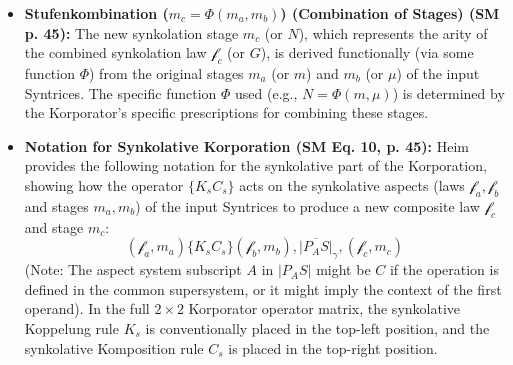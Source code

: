 \documentclass[12pt]{article}
\newcommand{\synkolator}{\mathcal{f}}
\newcommand{\synkolationsstufe}{m}
\newcommand{\aspektivsystem}{P}
\newcommand{\subjektiveraspekt}{S}
\begin{document}
\begin{itemize}
\begin{enumerate}
\begin{itemize}
            \item \textbf{Stufenkombination (\( \synkolationsstufe_c = \Phi(\synkolationsstufe_a,\synkolationsstufe_b) \)) (Combination of Stages) (SM p. 45):} The new synkolation stage \( \synkolationsstufe_c \) (or \(N\)), which represents the arity of the combined synkolation law \( \synkolator_c \) (or \(G\)), is derived functionally (via some function \( \Phi \)) from the original stages \( \synkolationsstufe_a \) (or \(m\)) and \( \synkolationsstufe_b \) (or \(\mu\)) of the input Syntrices. The specific function \( \Phi \) used (e.g., \( N = \Phi(m,\mu) \)) is determined by the Korporator's specific prescriptions for combining these stages.
            \item \textbf{Notation for Synkolative Korporation (SM Eq. 10, p. 45):}
            Heim provides the following notation for the synkolative part of the Korporation, showing how the operator \( \{K_s C_s\} \) acts on the synkolative aspects (laws \( \synkolator_a, \synkolator_b \) and stages \( \synkolationsstufe_a, \synkolationsstufe_b \)) of the input Syntrices to produce a new composite law \( \synkolator_c \) and stage \( \synkolationsstufe_c \):
            \begin{equation}
            (\synkolator_a, \synkolationsstufe_a) \{K_s C_s\} (\synkolator_b, \synkolationsstufe_b), \overline{|\aspektivsystem_A \subjektiveraspekt|}_\gamma, (\synkolator_c, \synkolationsstufe_c)
            \label{eq:original_synkolative_korporation}
            \end{equation}
            (Note: The aspect system subscript \(A\) in \(|\aspektivsystem_A \subjektiveraspekt|\) might be \(C\) if the operation is defined in the common supersystem, or it might imply the context of the first operand). In the full \( 2 \times 2 \) Korporator operator matrix, the synkolative Koppelung rule \( K_s \) is conventionally placed in the top-left position, and the synkolative Komposition rule \( C_s \) is placed in the top-right position.
        \end{itemize}
    \end{enumerate}


\end{itemize}
\end{document}
